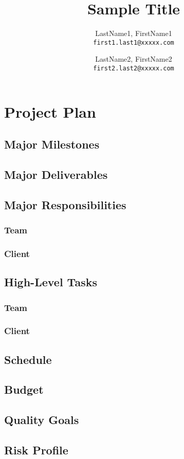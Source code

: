 \documentclass[10pt,letterpaper]{article}
\author{
	LastName1, FirstName1\\
	\texttt{first1.last1@xxxxx.com}
	\and
	LastName2, FirstName2\\
	\texttt{first2.last2@xxxxx.com}
}
\title{Sample Title}
\begin{document}
\section{Project Plan}\label{section:project_plan}


\subsection{Major Milestones}\label{subsection:major_milestones}

\subsection{Major Deliverables}\label{subsection:major_deliverables}

\subsection{Major Responsibilities}\label{subsection:major_responsibilities}
\subsubsection{Team}\label{subsubsection:major_responsibilities_team}
\subsubsection{Client}\label{subsubsection:major_responsibilities_client}

\subsection{High-Level Tasks}\label{subsection:high-level_tasks}
\subsubsection{Team}\label{subsubsection:high-level_tasks_team}
\subsubsection{Client}\label{subsubsection:high-level_tasks_client}

\subsection{Schedule} \label{subsection:schedule}

\subsection{Budget} \label{subsection:budget}

\subsection{Quality Goals}\label{subsection:quality_goals}

\subsection{Risk Profile}\label{subsection:risk_profile}
\end{document}
